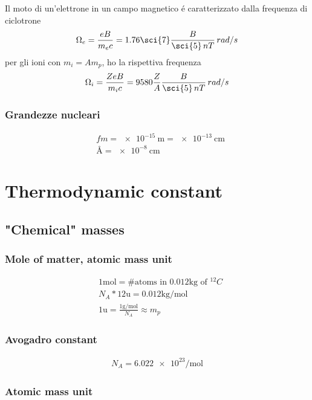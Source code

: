 Il moto di un'elettrone in un campo magnetico \'e caratterizzato dalla frequenza di ciclotrone
\begin{equation*}
\Omega_e=\frac{eB}{m_ec}=1.76\sci{7}\frac{B}{\sci{5}\,nT}\,rad/s
\end{equation*}
per gli ioni con $m_i=Am_p$, ho la rispettiva frequenza
\begin{equation*}
\Omega_i=\frac{ZeB}{m_ic}=9580\frac{Z}{A}\frac{B}{\sci{5}\,nT}\,rad/s
\end{equation*}

\subsection{Grandezze nucleari}

\begin{align*}
&fm=\SI{e-15}{\meter}=\SI{e-13}{\cm}\\
&\si{\angstrom}=\SI{e-8}{\cm}
\end{align*}

\chapter{Thermodynamic constant}
\PartialToc

\section{"Chemical" masses}

\subsection{Mole of matter, atomic mass unit}
\begin{align*}
&1\si{\mole}=\# \text{atoms in }0.012\si{\kilo\gram}\text{ of $^{12}C$}\\
&N_A*12 \si{\atomicmassunit}=0.012\si{\kilo\gram\per\mole}\\
&1\si{\atomicmassunit}=\frac{1\si{\gram\per\mole}}{N_A}\approx m_p
\end{align*}

\subsection{Avogadro constant}
\begin{align*}
N_A=\num{6.022e23}\si{\per\mole}
\end{align*}

\subsection{Atomic mass unit}

